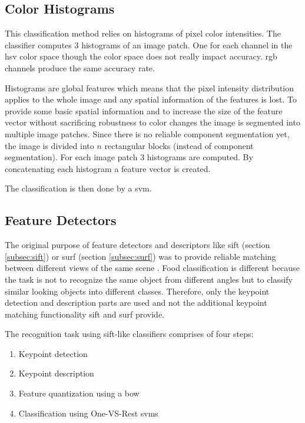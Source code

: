 \subsection{Color Histograms}
This classification method relies on histograms of pixel color intensities. The classifier computes 3 histograms of an image patch. One for each channel in the \gls{hsv} color space though the color space does not really impact accuracy. \gls{rgb} channels produce the same accuracy rate. 

Histograms are global features which means that the pixel intensity distribution applies to the whole image and any spatial information of the features is lost. To provide some basic spatial information and to increase the size of the feature vector without sacrificing robustness to color changes the image is segmented into multiple image patches. Since there is no reliable component segmentation yet, the image is divided into $n$ rectangular blocks {(instead of component segmentation)}. For each image patch 3 histograms are computed. By concatenating each histogram a feature vector is created.

The classification is then done by a \gls{svm}.

\subsection{Feature Detectors}
The original purpose of feature detectors and descriptors like \gls{sift} {(section \ref{subsec:sift})} or \gls{surf} {(section \ref{subsec:surf})} was to provide reliable matching between different views of the same scene \cite{Lowe2004}. Food classification is different because the task is not to recognize the same object from different angles but to classify similar looking objects into different classes. Therefore, only the keypoint detection and description parts are used and not the additional keypoint matching functionality \gls{sift} and \gls{surf} provide.

The recognition task using \gls{sift}-like classifiers comprises of four steps:
\begin{enumerate}
	\item Keypoint detection
	\item Keypoint description
	\item Feature quantization using a \gls{bow}
	\item Classification using One-VS-Rest \glspl{svm}
\end{enumerate}

